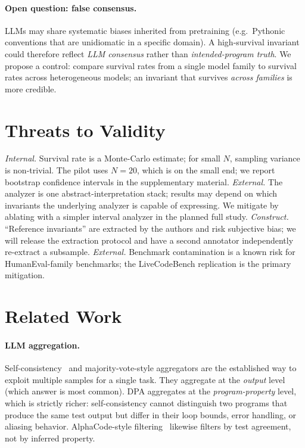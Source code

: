 \documentclass[sigconf,review,anonymous,nonacm]{acmart}
\begin{document}
\paragraph{Open question: false consensus.}
LLMs may share systematic biases inherited from pretraining
(e.g.\ Pythonic conventions that are unidiomatic in a specific domain).
A high-survival invariant could therefore reflect \emph{LLM consensus}
rather than \emph{intended-program truth}. We propose a control:
compare survival rates from a single model family to survival rates
across heterogeneous models; an invariant that survives \emph{across
families} is more credible.

\section{Threats to Validity}
\label{sec:threats}

\noindent\emph{Internal.} Survival rate is a Monte-Carlo estimate; for
small $N$, sampling variance is non-trivial. The pilot uses $N=20$,
which is on the small end; we report bootstrap confidence intervals in
the supplementary material. \emph{External.} The analyzer is one
abstract-interpretation stack; results may depend on which invariants
the underlying analyzer is capable of expressing. We mitigate by
ablating with a simpler interval analyzer in the planned full study.
\emph{Construct.} ``Reference invariants'' are extracted by the authors
and risk subjective bias; we will release the extraction protocol and
have a second annotator independently re-extract a subsample.
\emph{External.} Benchmark contamination is a known risk for
HumanEval-family benchmarks; the LiveCodeBench replication is the
primary mitigation.

\section{Related Work}
\label{sec:related}

\paragraph{LLM aggregation.} Self-consistency~\cite{wang2023selfconsistency}
and majority-vote-style aggregators are the established way to exploit
multiple samples for a single task. They aggregate at the
\emph{output} level (which answer is most common). DPA aggregates at
the \emph{program-property} level, which is strictly richer:
self-consistency cannot distinguish two programs that produce the same
test output but differ in their loop bounds, error handling, or
aliasing behavior. AlphaCode-style filtering~\cite{li2022alphacode}
likewise filters by test agreement, not by inferred property.
\end{document}
